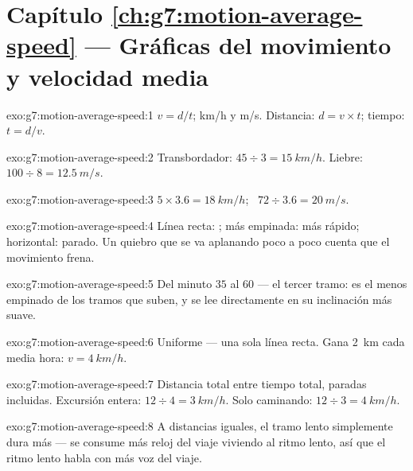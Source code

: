 \section*{Capítulo \ref{ch:g7:motion-average-speed} --- Gráficas del movimiento y velocidad media}

\begin{solution}{exo:g7:motion-average-speed:1}
$v = d/t$;  \unit{km/h} y \unit{m/s}. Distancia: $d = v
\times t$; tiempo: $t = d/v$.
\end{solution}

\begin{solution}{exo:g7:motion-average-speed:2}
Transbordador: $45 \div 3 = \qty{15}{km/h}$. Liebre: $100 \div 8 =
\qty{12.5}{m/s}$.
\end{solution}

\begin{solution}{exo:g7:motion-average-speed:3}
$5 \times 3.6 = \qty{18}{km/h}$; \ $72 \div 3.6 = \qty{20}{m/s}$.
\end{solution}

\begin{solution}{exo:g7:motion-average-speed:4}
Línea recta: ; más empinada: más rápido;
horizontal: parado. Un quiebro que se va aplanando poco a poco cuenta
que el movimiento frena.
\end{solution}

\begin{solution}{exo:g7:motion-average-speed:5}
Del minuto $35$ al $60$ --- el tercer tramo: es el menos empinado de
los tramos que suben, y se lee directamente en su inclinación más
suave.
\end{solution}

\begin{solution}{exo:g7:motion-average-speed:6}
Uniforme --- una sola línea recta. Gana \qty{2}{km} cada media hora:
$v = \qty{4}{km/h}$.
\end{solution}

\begin{solution}{exo:g7:motion-average-speed:7}
Distancia total entre tiempo total, paradas incluidas. Excursión
entera: $12 \div 4 = \qty{3}{km/h}$. Solo caminando: $12 \div 3 =
\qty{4}{km/h}$.
\end{solution}

\begin{solution}{exo:g7:motion-average-speed:8}
A distancias iguales, el tramo lento simplemente dura más --- se
consume más reloj del viaje viviendo al ritmo lento, así que el ritmo
lento habla con más voz del viaje.
\end{solution}


